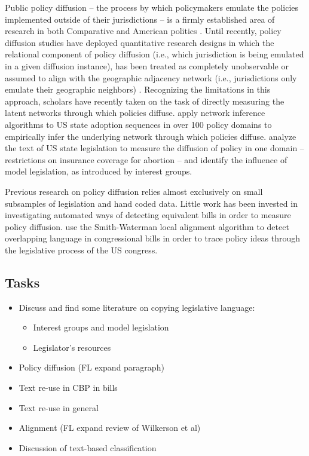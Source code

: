 \documentclass[12pt]{article} %
\begin{document}
Public policy diffusion -- the process by which policymakers emulate the policies implemented outside of their jurisdictions -- is a firmly established area of research in both Comparative \citep{simmons2004,gilardi2009} and American politics \citep{walker1969,berry1990,shipan2006,nicholson-crotty2009}. Until recently, policy diffusion studies have deployed quantitative research designs in which the relational component of policy diffusion (i.e., which jurisdiction is being emulated in a given diffusion instance), has been treated as completely unobservable or assumed to align with the geographic adjacency network (i.e., jurisdictions only emulate their geographic neighbors) \citep{volden2006,boehmke2009}. Recognizing the limitations in this approach, scholars have recently taken on the task of directly measuring the latent networks through which policies diffuse. \cite{desmarais2015} apply network inference algorithms to US state adoption sequences in over 100 policy domains to empirically infer the underlying network through which policies diffuse. \cite{garrett2015} analyze the text of US state legislation to measure the diffusion of policy in one domain -- restrictions on insurance coverage for abortion -- and identify the influence of model legislation, as introduced by interest groups.

Previous research on policy diffusion relies almost exclusively on small subsamples of legislation and hand coded data. Little work has been invested in investigating automated ways of detecting equivalent bills in order to measure policy diffusion. 
\citet{wilkerson2015tracing} use the Smith-Waterman local alignment algorithm 
\citep{smith1981identification} to detect overlapping language in congressional bills in order to trace policy ideas through the legislative process of the US congress. 

\subsection{Tasks}
\begin{itemize}
\item Discuss and find some literature on copying legislative language: 
    \begin{itemize}
        \item Interest groups and model legislation
        \item Legislator's resources
    \end{itemize}
\item Policy diffusion (FL expand paragraph)
\item Text re-use in CBP in bills 
\item Text re-use in general
\item Alignment (FL expand review of Wilkerson et al)
\item Discussion of text-based classification
\end{itemize}
\end{document}

